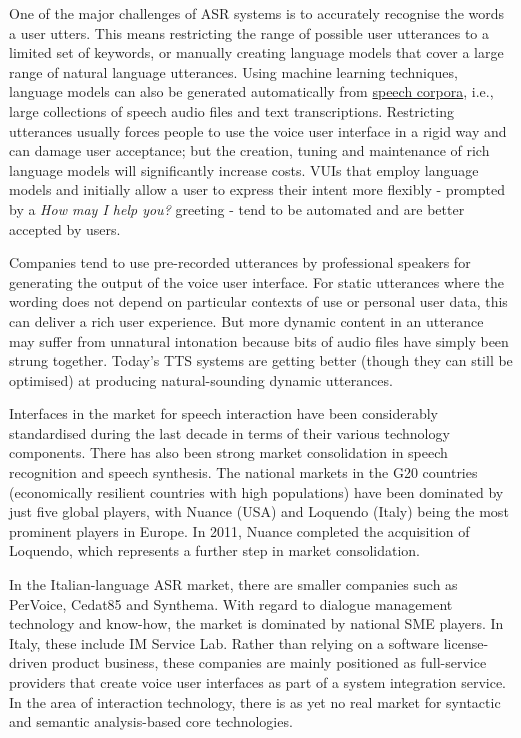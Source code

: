 \documentclass[]{../../metanetpaper}
\begin{document}
\begin{multicols}{2}
One of the major challenges of ASR systems is to accurately recognise the
words a user utters. This means restricting the range of possible user
utterances to a limited set of keywords, or manually creating language models
that cover a large range of natural language utterances. Using machine
learning techniques, language models can also be generated automatically from
\underline{speech corpora}, i.e., large collections of speech audio files and
text transcriptions. Restricting utterances usually forces people to use the
voice user interface in a rigid way and can damage user acceptance; but the
creation, tuning and maintenance of rich language models will significantly
increase costs. VUIs that employ language models and initially allow a user to
express their intent more flexibly - prompted by a \emph{How may I help
you?} greeting - tend to be automated and are better accepted by users. 



Companies tend to use pre-recorded utterances by professional speakers for generating the output of the voice user interface. For static utterances where the wording does not depend on particular contexts of use or personal user data, this can deliver a rich user experience. But more dynamic content in an utterance may suffer from unnatural intonation because bits of audio files have simply been strung together. Today's TTS systems are getting better (though they can still be optimised) at producing natural-sounding dynamic utterances.

Interfaces in the market for speech interaction have been considerably standardised during the last decade in terms of their various technology components. There has also been strong market consolidation in speech recognition and speech synthesis. The national markets in the G20 countries (economically resilient countries with high populations) have been dominated by just five global players, with Nuance (USA) and Loquendo (Italy) being the most prominent players in Europe. In 2011, Nuance completed the acquisition of Loquendo, which represents a further step in market consolidation.

In the Italian-language ASR market, there are smaller companies such as PerVoice, Cedat85 and Synthema. With regard to dialogue management technology and know-how, the market is dominated by national SME players. In Italy, these include IM Service Lab. Rather than relying on a software license-driven product business, these companies are mainly positioned as full-service providers that create voice user interfaces as part of a system integration service. In the area of interaction technology, there is as yet no real market for syntactic and semantic analysis-based core technologies.


\end{multicols}
\end{document}
